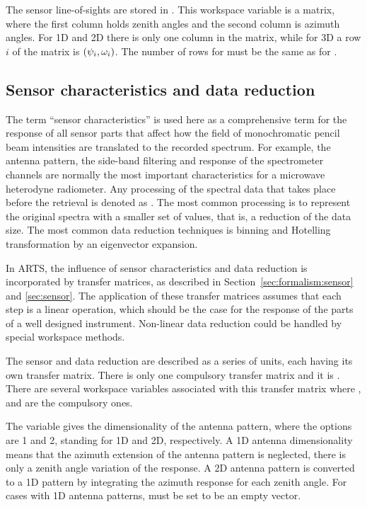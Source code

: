 The sensor line-of-sights are stored in . This
workspace variable is a matrix, where the first column holds zenith
angles and the second column is azimuth angles. For 1D and 2D there is
only one column in the matrix, while for 3D a row $i$ of the matrix is
$(\psi_{i},\omega_{i})$. The number of rows for
 must be the same as for
.


\subsection{Sensor characteristics and data reduction}
\label{sec:fm_defs:sensorchar}

The term ``sensor characteristics'' is
used here as a comprehensive term for the response of all sensor parts
that affect how the field of monochromatic pencil beam intensities are
translated to the recorded spectrum. For example, the antenna pattern,
the side-band filtering and response of the spectrometer channels are
normally the most important characteristics for a microwave heterodyne
radiometer. Any processing of the spectral data that takes place
before the retrieval is denoted as . The
most common processing is to represent the original spectra with a
smaller set of values, that is, a reduction of the data size. The most
common data reduction techniques is binning and Hotelling
transformation by an eigenvector expansion.

In ARTS, the influence of sensor characteristics and data reduction is
incorporated by transfer matrices, as
described in Section~\ref{sec:formalism:sensor} and \ref{sec:sensor}.
The application of these transfer matrices assumes that each step is a
linear operation, which should be the case for the response of the
parts of a well designed instrument. Non-linear data reduction could
be handled by special workspace methods.

The sensor and data reduction are described as a series of units, each
having its own transfer matrix.  There is only one compulsory transfer
matrix and it is . There are several workspace
variables associated with this transfer matrix where
,  and
 are the compulsory ones.

The variable  gives the dimensionality of the
antenna pattern, where the
options are 1 and 2, standing for 1D and 2D, respectively. A 1D
antenna dimensionality means that the azimuth extension of the
antenna pattern is neglected, there is only a zenith angle variation
of the response. A 2D antenna pattern is converted to a 1D pattern by
integrating the azimuth response for each zenith angle. For cases
with 1D antenna patterns,  must be set to
be an empty vector.

